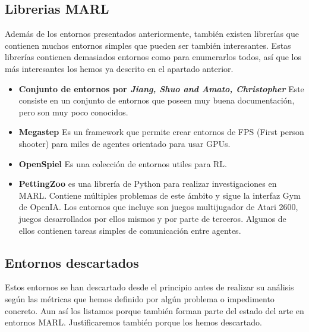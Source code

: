 \subsection{Librerias MARL}
Además de los entornos presentados anteriormente, también existen librerías que contienen muchos entornos simples que pueden ser también interesantes. Estas librerías contienen demasiados entornos como para enumerarlos todos, así que los más interesantes los hemos ya descrito en el apartado anterior.

\begin{itemize}
	\item \textbf{Conjunto de entornos por \textit{Jiang, Shuo and Amato, Christopher}} \cite{jiang-repo} Este consiste en un conjunto de entornos que poseen muy buena documentación, pero son muy poco conocidos.

	\item \textbf{Megastep} \cite{megastep-repo} Es un framework que permite crear entornos de FPS (First person shooter) para miles de agentes orientado para usar GPUs.

	\item \textbf{OpenSpiel} \cite{openspiel-repo} Es una colección de entornos utiles para RL.

	\item \textbf{PettingZoo} \cite{petting-repo} es una librería de Python para realizar investigaciones en MARL. Contiene múltiples problemas de este ámbito y sigue la interfaz Gym de OpenIA. Los entornos que incluye son juegos multijugador de Atari 2600, juegos desarrollados por ellos mismos y por parte de terceros. Algunos de ellos contienen tareas simples de comunicación entre agentes.\cite{env-list}


\end{itemize}

\subsection{Entornos descartados}
Estos entornos se han descartado desde el principio antes de realizar su análisis según las métricas que hemos definido por algún problema o impedimento concreto. Aun así los listamos porque también forman parte del estado del arte en entornos MARL. Justificaremos también porque los hemos descartado.

